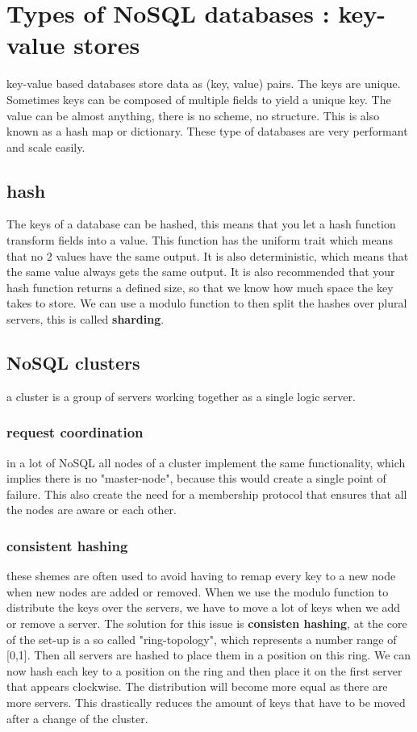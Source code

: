 \documentclass{report}
\begin{document}
	\chapter{Types of NoSQL databases : key-value stores}
		key-value based databases store data as (key, value) pairs. The keys are unique. Sometimes keys can be composed of multiple fields to yield a unique key.
		The value can be almost anything, there is no scheme, no structure. This is also known as a hash map or dictionary.
		These type of databases are very performant and scale easily.
		\section{hash}
			The keys of a database can be hashed, this means that you let a hash function transform fields into a value. This function has the uniform trait which means that no 2 values have the same output. It is also deterministic, which means that the same value always gets the same output. It is also recommended that your hash function returns a defined size, so that we know how much space the key takes to store. We can use a modulo function to then split the hashes over plural servers, this is called \textbf{sharding}.
		\section{NoSQL clusters}
			a cluster is a group of servers working together as a single logic server.
			\subsection{request coordination}
				in a lot of NoSQL all nodes of a cluster implement the same functionality, which implies there is no "master-node", because this would create a single point of failure. This also create the need for a membership protocol that ensures that all the nodes are aware or each other.
			\subsection{consistent hashing}
				these shemes are often used to avoid having to remap every key to a new node when new nodes are added or removed. When we use the modulo function to distribute the keys over the servers, we have to move a lot of keys when we add or remove a server. The solution for this issue is \textbf{consisten hashing}, at the core of the set-up is a so called "ring-topology", which represents a number range of [0,1]. Then all servers are hashed to place them in a position on this ring. We can now hash each key to a position on the ring and then place it on the first server that appears clockwise. The distribution will become more equal as there are more servers. This drastically reduces the amount of keys that have to be moved after a change of the cluster.
\end{document}
